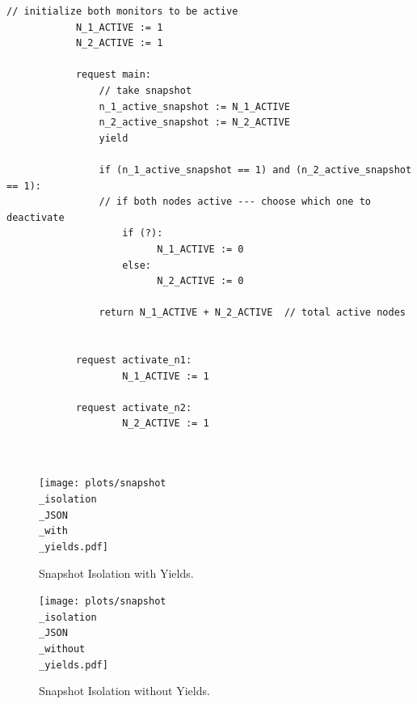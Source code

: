 \begin{minipage}[t]{1.0\textwidth}
	\begin{lstlisting}[caption={Snapshot-based monitor deactivation (not serializable, as it can return a sume of 0 active monitors)}]
			// initialize both monitors to be active
			N_1_ACTIVE := 1
			N_2_ACTIVE := 1
			
			request main:
				// take snapshot
				n_1_active_snapshot := N_1_ACTIVE
				n_2_active_snapshot := N_2_ACTIVE
				yield
				
				if (n_1_active_snapshot == 1) and (n_2_active_snapshot == 1):
				// if both nodes active --- choose which one to deactivate 
					if (?): 
						  N_1_ACTIVE := 0
					else:
						  N_2_ACTIVE := 0
					
				return N_1_ACTIVE + N_2_ACTIVE  // total active nodes
				
			
			request activate_n1:
				    N_1_ACTIVE := 1
			
			request activate_n2:
				    N_2_ACTIVE := 1
			
			
		\end{lstlisting}
\end{minipage}




\begin{figure}[h]
	\centering
	\texttt{[image: plots/snapshot\\\_isolation\\\_JSON\\\_with\\\_yields.pdf]}
	\caption{Snapshot Isolation with Yields.}
	\label{fig:snapshotIsolationJsonWithYields}
\end{figure}




\begin{figure}[h]
	\centering
	\texttt{[image: plots/snapshot\\\_isolation\\\_JSON\\\_without\\\_yields.pdf]}
	\caption{Snapshot Isolation without Yields.}
	\label{fig:snapshotIsolationJsonWithoutYields}
\end{figure}





